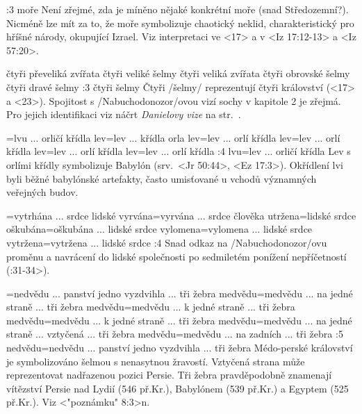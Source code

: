 :3 {moře} 
     Není zřejmé, zda je míněno nějaké konkrétní moře (snad Středozemní?). Nicméně
     lze mít za to, že moře symbolizuje chaotický neklid, charakteristický pro hříšné národy,
     okupující Izrael. Viz interpretaci ve  <17> a v <Iz 17:12-13> a <Iz 57:20>. 

   {čtyři převeliká zvířata}   %
   {čtyři veliké šelmy}   %
   {čtyři veliká zvířata}   %
   {čtyři obrovské šelmy}   %
   {čtyři dravé šelmy}   %
:3 {čtyři šelmy}
    Čtyři \x/šelmy/ reprezentují čtyři království (<17> a <23>).
    Spojitost  s \x/Nabuchodonozor/ovou vizí sochy v kapitole 2 je zřejmá. Pro jejich identifikaci viz náčrt      {\it Danielovy vize\/} na str.~\pgref[danielovyvize]. 

={lvu ... orličí křídla}  %
   {lev}={lev ... křídla orla}   %
   {lev}={lev ... orlí křídla}   %
   {lev}={lev ... orlí křídla}   %
   {lev}={lev ... orlí křídla}   %
   {lev}={lev ... orlí křídla}   %
:4 {lvu}={lev ... orličí křídla} 
     Lev s orlími křídly symbolizuje Babylón (srv.~<Jr 50:44>, <Ez 17:3>).
     Okřídlení lvi byli běžné babylónské artefakty, často umisťované u vchodů významných veřejných budov.      
     
={vytrhána ... srdce lidské}   %
   {vyrvána}={vyrvána ... srdce člověka}   %
   {utržena}={lidské srdce}   %
   {oškubána}={oškubána ... lidské srdce}   %
   {vylomena}={vylomena ... lidské srdce}   %
   {vytržena}={vytržena ... lidské srdce}   %
:4 {} Snad odkaz na \x/Nabuchodonozor/ovu
     proměnu a navrácení do lidské společnosti po sedmiletém ponížení nepříčetností
     (:31-34>).

={nedvědu ... panství jedno vyzdvihla ... tři žebra}    %
   {medvědu}={medvědu ... na jedné straně ... tři žebra}   %
   {medvědu}={medvědu ... k jedné straně ... tři žebra}   %
   {medvědu}={medvědu ... k jedné straně ... tři žebra}   %
   {medvědu}={medvědu ... na jedné straně ... vztyčená ... tři žebra}   %
   {medvědu}={medvědu ... na zadních ...  tři žebra}   %
:5 {nedvědu}={nedvědu ... panství jedno vyzdvihla ... tři žebra} 
     Médo-perské království je symbolizováno šelmou s nenasytnou žravostí. Vztyčená
     strana může reprezentovat nadřazenou pozici Persie. Tři žebra pravděpodobně znamenají
     vítězství Persie nad Lydií (546 př.Kr.), Babylónem (539 př.Kr.) a Egyptem (525 př.Kr.).
     Viz <"poznámku" 8:3>n.

